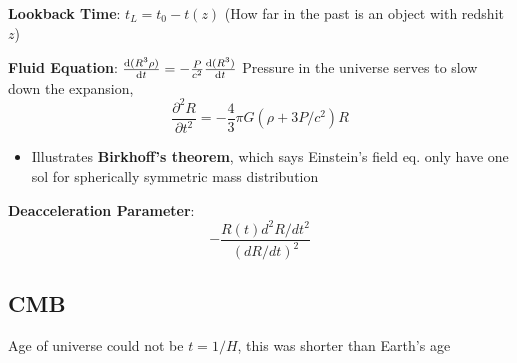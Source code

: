 \documentclass[12pt]{article}
\begin{document}
\textbf{Lookback Time}: $t_L = t_0 - t(z)$ (How far in the past is an object with redshit $z$)

\textbf{Fluid Equation}: $\dv{(R^3\rho)}{t} = -\frac{P}{c^2}\dv{(R^3)}{t}$
Pressure in the universe serves to slow down the expansion, $$\frac{\partial^2R}{\partial t^2} = -\frac{4}{3}\pi G(\rho + 3P/c^2)R$$
\begin{itemize}
\item Illustrates \textbf{Birkhoff's theorem}, which says Einstein's field eq. only have one sol for spherically symmetric mass distribution
\end{itemize}
\textbf{Deacceleration Parameter}: $$-\frac{R(t) d^2R/dt^2 }{(dR/dt)^2}$$

\subsection{CMB}

Age of universe could not be $t = 1/H$, this was shorter than Earth's age
\end{document}
